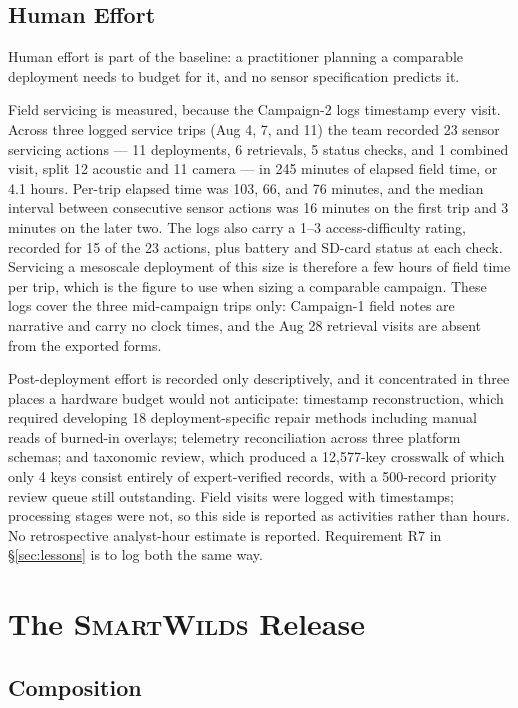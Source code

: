 \documentclass[sigconf]{acmart}
\newcommand{\smartwilds}{\textsc{SmartWilds}\xspace}
\begin{document}
\subsection{Human Effort}
\label{sec:effort}

Human effort is part of the baseline: a practitioner planning a
comparable deployment needs to budget for it, and no sensor
specification predicts it.

Field servicing is measured, because the Campaign-2 logs timestamp every
visit. Across three logged service trips (Aug 4, 7, and 11) the team
recorded 23 sensor servicing actions --- 11 deployments, 6 retrievals,
5 status checks, and 1 combined visit, split 12 acoustic and 11 camera
--- in 245 minutes of elapsed field time, or 4.1 hours. Per-trip elapsed
time was 103, 66, and 76 minutes, and the median interval between
consecutive sensor actions was 16 minutes on the first trip and
3 minutes on the later two. The logs also carry a 1--3 access-difficulty
rating, recorded for 15 of the 23 actions, plus battery and SD-card
status at each check. Servicing a mesoscale deployment of this size is
therefore a few hours of field time per trip, which is the figure to use
when sizing a comparable campaign. These logs cover the three
mid-campaign trips only: Campaign-1 field notes are narrative and carry
no clock times, and the Aug 28 retrieval visits are absent from the
exported forms.

Post-deployment effort is recorded only descriptively, and it
concentrated in three places a hardware budget would not anticipate:
timestamp reconstruction, which required developing 18
deployment-specific repair methods including manual reads of burned-in
overlays; telemetry reconciliation across three platform schemas; and
taxonomic review, which produced a 12{,}577-key crosswalk of which only
4 keys consist entirely of expert-verified records, with a 500-record
priority review queue still outstanding. Field visits were logged with
timestamps; processing stages were not, so this side is reported as
activities rather than hours. No retrospective analyst-hour estimate is
reported. Requirement R7 in \S\ref{sec:lessons} is to log both the same way.

\section{The \smartwilds Release}
\label{sec:release}

\subsection{Composition}
\end{document}

